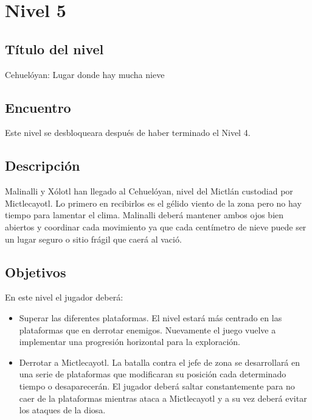 \section{Nivel 5} \label{Nivel:Niv05}
        \subsection{Título del nivel}
        Cehuelóyan: Lugar donde hay mucha nieve
        \subsection{Encuentro}
        Este nivel se desbloqueara después de haber terminado el Nivel 4.
        \subsection{Descripción}
Malinalli y Xólotl han llegado al Cehuelóyan, nivel del Mictlán custodiad por Mictlecayotl. Lo primero en recibirlos es el gélido viento de la zona pero no hay tiempo para lamentar el clima. Malinalli deberá mantener ambos ojos bien abiertos y coordinar cada movimiento ya que cada centímetro de nieve puede ser un lugar seguro o sitio frágil que caerá al vació.      
        \subsection{Objetivos}
En este nivel el jugador deberá:
\begin{itemize}
        \item Superar las diferentes plataformas. El nivel estará más centrado en las plataformas que en derrotar enemigos. Nuevamente el juego vuelve a implementar una progresión horizontal para la exploración. 
        \item  Derrotar a Mictlecayotl. La batalla contra el jefe de zona se desarrollará en una serie de plataformas que modificaran su posición cada determinado tiempo o desaparecerán. El jugador deberá saltar constantemente para no caer de la plataformas mientras ataca a Mictlecayotl y a su vez deberá evitar los ataques de la diosa.
\end{itemize}


